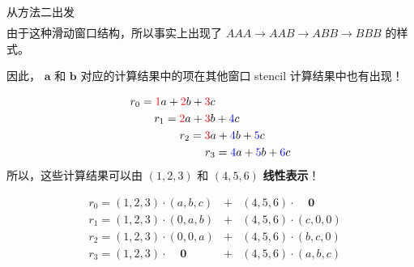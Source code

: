 \documentclass[aspectratio=169,10pt]{beamer}
\begin{document}
\begin{frame}[fragile,shrink=42]{从方法二出发}
\[\begin{aligned}
\end{aligned}
\]
由于这种滑动窗口结构，所以事实上出现了 $AAA\to AAB\to ABB\to BBB$ 的样式。
\par
因此， $\mathbf a$ 和 $\mathbf b$ 对应的计算结果中的项在其他窗口 stencil 计算结果中也有出现！
\par
\[
\begin{aligned}
r_0=\textcolor{red}1a+\textcolor{red}2b + \textcolor{red}{3}&c\\
r_1=\textcolor{red}2a+\textcolor{red}{3}&b+\textcolor{blue}{4}c\\
r_2=\textcolor{red}{3}&a+\textcolor{blue}{4}b+\textcolor{blue}5c\\
r&_3=\textcolor{blue}{4}a+\textcolor{blue}5b+\textcolor{blue}6c\\
\end{aligned}
\]
所以，这些计算结果可以由 $(1,2,3)$ 和 $(4,5,6)$ \textbf{线性表示}！
\par
\[
\begin{aligned}
&r_0=(1,2,3)·(a,b,c)& +&(4,5,6)·\;\;\;\;\mathbf 0\\
&r_1=(1,2,3)·(0,a,b)& +&(4,5,6)·(c,0,0)\\
&r_2=(1,2,3)·(0,0,a)& +&(4,5,6)·(b,c,0)\\
&r_3=(1,2,3)·\;\;\;\;\mathbf 0 &+&(4,5,6)·(a,b,c)
\end{aligned}
\]
\end{frame}
\end{document}
